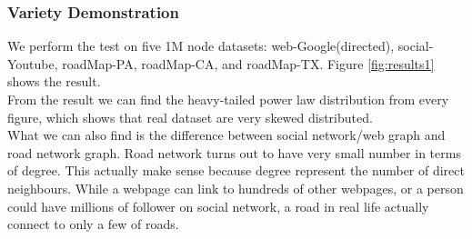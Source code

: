 \subsubsection{Variety  Demonstration}
We perform the test on five 1M node datasets: web-Google(directed), social-Youtube, roadMap-PA, roadMap-CA, and roadMap-TX. Figure \ref{fig:results1} shows the result.\\
From the result we can find the heavy-tailed power law distribution from every figure, which shows that real dataset are very skewed distributed.\\
What we can also find is the difference between social network/web graph and road network graph. Road network turns out to have very small number in terms of degree. This actually make sense because degree represent the number of direct neighbours. While a webpage can link to hundreds of other webpages, or a person could have millions of follower on social network, a road in real life actually connect to only a few of roads.
